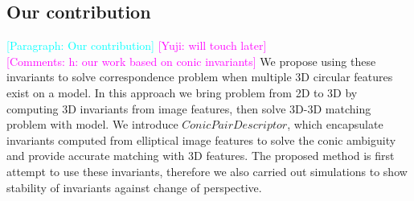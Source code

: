 \documentclass{bmvc2k}
\newcommand{\parmessage}[1]{\textcolor{cyan}{[Paragraph: #1]}}
\newcommand{\comments}[1]{\textcolor{magenta}{[Comments: #1]}}
\newcommand{\yuji}[1]{\textcolor{magenta}{[Yuji: #1]}}
\newcommand{\revise}[2]{\textcolor{red}{\sout{#1}} \textcolor{blue}{#2}}  %
\begin{document}
\subsection{Our contribution}
\parmessage{Our contribution}
\yuji{will touch later}\\
\comments{h: our work based on conic invariants}
We propose using these invariants to solve correspondence problem when multiple 3D circular features exist on a model. 
In this approach we bring problem from 2D to 3D by computing 3D invariants from image features, then solve 3D-3D matching problem with model.
We introduce $ Conic Pair Descriptor $, which encapsulate invariants computed from elliptical image features to solve the conic ambiguity and provide accurate matching with 3D features.%
The proposed method is first attempt to use these invariants, therefore we also carried out simulations to show stability of invariants against change of perspective.  
\end{document}

